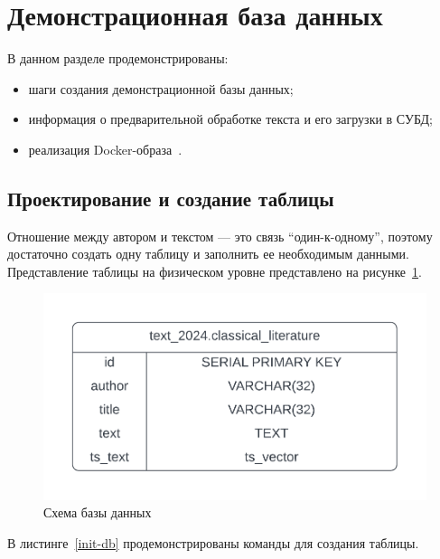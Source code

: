 
\section{Демонстрационная база данных}

В данном разделе продемонстрированы:
\begin{itemize}
    \item шаги создания демонстрационной базы данных;
    \item информация о предварительной обработке текста и его загрузки в СУБД;
    \item реализация Docker-образа~\cite{DockerDocs}.
\end{itemize}

\subsection{Проектирование и создание таблицы}

Отношение между автором и текстом --- это связь \enquote{один-к-одному}, поэтому достаточно создать одну таблицу и заполнить ее необходимым данными.
Представление таблицы на физическом уровне представлено на рисунке~\ref{schema}.

\begin{figure}[H]
    \centering
    \includegraphics[width=\textwidth, scale=0.85]{figures/er-diagram}
    \caption{Схема базы данных}
    \label{schema}
\end{figure}

В листинге~\ref{init-db} продемонстрированы команды для создания таблицы.

